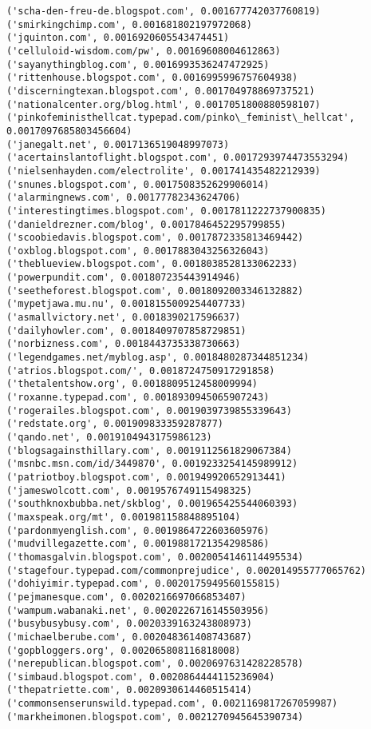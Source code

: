 \documentclass[11pt]{article}
\begin{document}
\begin{Verbatim}[commandchars=\\\{\}]
('scha-den-freu-de.blogspot.com', 0.001677742037760819)
('smirkingchimp.com', 0.001681802197972068)
('jquinton.com', 0.0016920605543474451)
('celluloid-wisdom.com/pw', 0.00169608004612863)
('sayanythingblog.com', 0.0016993536247472925)
('rittenhouse.blogspot.com', 0.0016995996757604938)
('discerningtexan.blogspot.com', 0.001704978869737521)
('nationalcenter.org/blog.html', 0.0017051800880598107)
('pinkofeministhellcat.typepad.com/pinko\_feminist\_hellcat', 0.0017097685803456604)
('janegalt.net', 0.0017136519048997073)
('acertainslantoflight.blogspot.com', 0.0017293974473553294)
('nielsenhayden.com/electrolite', 0.001741435482212939)
('snunes.blogspot.com', 0.0017508352629906014)
('alarmingnews.com', 0.00177782343624706)
('interestingtimes.blogspot.com', 0.0017811222737900835)
('danieldrezner.com/blog', 0.0017846452295799855)
('scoobiedavis.blogspot.com', 0.0017872335813469442)
('oxblog.blogspot.com', 0.0017883043256326043)
('theblueview.blogspot.com', 0.0018038528133062233)
('powerpundit.com', 0.001807235443914946)
('seetheforest.blogspot.com', 0.0018092003346132882)
('mypetjawa.mu.nu', 0.0018155009254407733)
('asmallvictory.net', 0.0018390217596637)
('dailyhowler.com', 0.0018409707858729851)
('norbizness.com', 0.0018443735338730663)
('legendgames.net/myblog.asp', 0.0018480287344851234)
('atrios.blogspot.com/', 0.0018724750917291858)
('thetalentshow.org', 0.0018809512458009994)
('roxanne.typepad.com', 0.0018930945065907243)
('rogerailes.blogspot.com', 0.0019039739855339643)
('redstate.org', 0.001909833359287877)
('qando.net', 0.0019104943175986123)
('blogsagainsthillary.com', 0.0019112561829067384)
('msnbc.msn.com/id/3449870', 0.0019233254145989912)
('patriotboy.blogspot.com', 0.001949920652913441)
('jameswolcott.com', 0.0019576749115498325)
('southknoxbubba.net/skblog', 0.001965425544060393)
('maxspeak.org/mt', 0.001981158848895104)
('pardonmyenglish.com', 0.0019864722603605976)
('mudvillegazette.com', 0.0019881721354298586)
('thomasgalvin.blogspot.com', 0.0020054146114495534)
('stagefour.typepad.com/commonprejudice', 0.002014955777065762)
('dohiyimir.typepad.com', 0.0020175949560155815)
('pejmanesque.com', 0.0020216697066853407)
('wampum.wabanaki.net', 0.0020226716145503956)
('busybusybusy.com', 0.0020339163243808973)
('michaelberube.com', 0.002048361408743687)
('gopbloggers.org', 0.002065808116818008)
('nerepublican.blogspot.com', 0.0020697631428228578)
('simbaud.blogspot.com', 0.0020864444115236904)
('thepatriette.com', 0.0020930614460515414)
('commonsenserunswild.typepad.com', 0.0021169817267059987)
('markheimonen.blogspot.com', 0.0021270945645390734)

\end{Verbatim}
\end{document}
